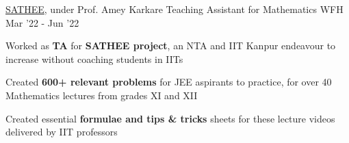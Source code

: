 \begin{cventries}
  \excventry
  {\href{https://satheejee.prutor.ai/}{SATHEE}, under Prof. Amey Karkare}
  {Teaching Assistant for Mathematics}
  {WFH}
  {Mar '22 - Jun '22}
  {
    \begin{cvitems}
      \item Worked as \textbf{TA} for \textbf{SATHEE project}, an NTA and IIT Kanpur endeavour to increase without coaching students in IITs
      \item Created \textbf{600+ relevant problems} for JEE aspirants to practice, for over 40 Mathematics lectures from grades XI and XII
      \item Created essential \textbf{formulae and tips \& tricks} sheets for these lecture videos delivered by IIT professors
    \end{cvitems}
  }
\end{cventries}